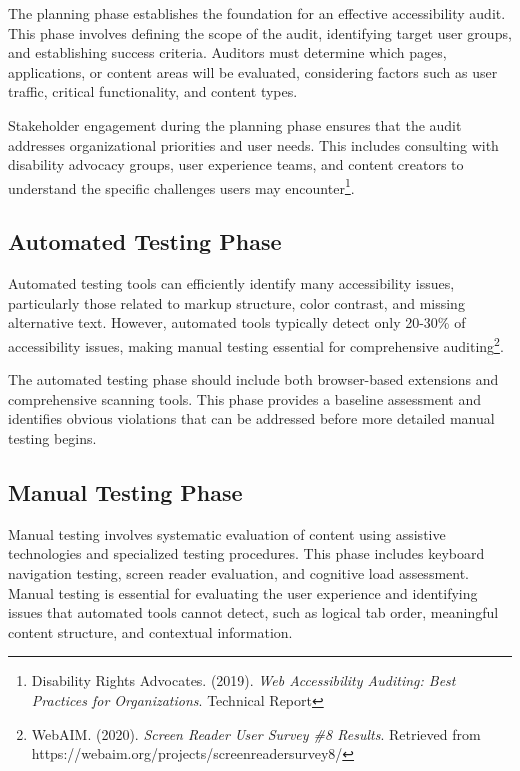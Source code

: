 The planning phase establishes the foundation for an effective accessibility audit. This phase involves defining the scope of the audit, identifying target user groups, and establishing success criteria. Auditors must determine which pages, applications, or content areas will be evaluated, considering factors such as user traffic, critical functionality, and content types.

Stakeholder engagement during the planning phase ensures that the audit addresses organizational priorities and user needs. This includes consulting with disability advocacy groups, user experience teams, and content creators to understand the specific challenges users may encounter\footnote{Disability Rights Advocates. (2019). \textit{Web Accessibility Auditing: Best Practices for Organizations}. Technical Report}.

\subsection{Automated Testing Phase}

Automated testing tools can efficiently identify many accessibility issues, particularly those related to markup structure, color contrast, and missing alternative text. However, automated tools typically detect only 20-30\% of accessibility issues, making manual testing essential for comprehensive auditing\footnote{WebAIM. (2020). \textit{Screen Reader User Survey \#8 Results}. Retrieved from https://webaim.org/projects/screenreadersurvey8/}.

The automated testing phase should include both browser-based extensions and comprehensive scanning tools. This phase provides a baseline assessment and identifies obvious violations that can be addressed before more detailed manual testing begins.

\subsection{Manual Testing Phase}

Manual testing involves systematic evaluation of content using assistive technologies and specialized testing procedures. This phase includes keyboard navigation testing, screen reader evaluation, and cognitive load assessment. Manual testing is essential for evaluating the user experience and identifying issues that automated tools cannot detect, such as logical tab order, meaningful content structure, and contextual information.

